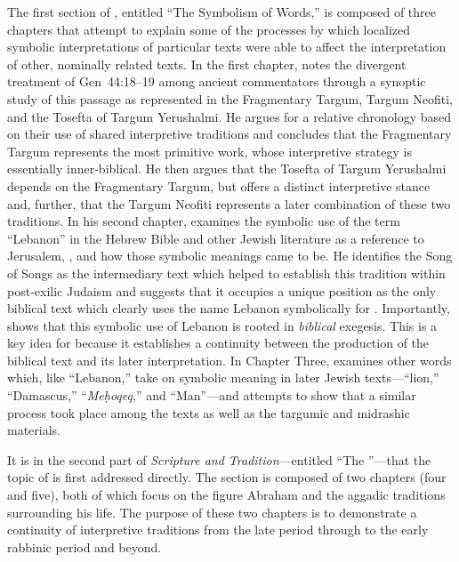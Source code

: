 The first section of , entitled ``The Symbolism of Words,'' is composed of three chapters that attempt to explain some of the processes by which localized symbolic interpretations of particular texts were able to affect the interpretation of other, nominally related texts.
%
In the first chapter, \vermes notes the divergent treatment of Gen~44:18--19 among ancient commentators through a synoptic study of this passage as represented in the Fragmentary Targum, Targum Neofiti, and the Tosefta of Targum Yerushalmi. He argues for a relative chronology based on their use of shared interpretive traditions and concludes that the Fragmentary Targum represents the most primitive work, whose interpretive strategy is essentially inner-biblical. He then argues that the Tosefta of Targum Yerushalmi depends on the Fragmentary Targum, but offers a distinct interpretive stance and, further, that the Targum Neofiti represents a later combination of these two traditions.
%
In his second chapter, \vermes examines the symbolic use of the term ``Lebanon'' in the Hebrew Bible and other Jewish literature as a reference to Jerusalem, \thetemple, and how those symbolic meanings came to be. He identifies the Song of Songs as the intermediary text which helped to establish this tradition within post-exilic Judaism and suggests that it occupies a unique position as the only biblical text which clearly uses the name Lebanon symbolically for \thetemple. Importantly, \vermes shows that this symbolic use of Lebanon is rooted in \emph{biblical} exegesis. This is a key idea for \vermes because it establishes a continuity between the production of the biblical text and its later interpretation.
%
In Chapter Three, \vermes examines other words which, like ``Lebanon,'' take on symbolic meaning in later Jewish texts---``lion,'' ``Damascus,'' ``\emph{Meḥoqeq},'' and ``Man''---and attempts to show that a similar process took place among the \dss texts as well as the targumic and midrashic materials. 

It is in the second part of \emph{Scripture and Tradition}---entitled ``The \rwb''---that the topic of \rwb is first addressed directly. The section is composed of two chapters (four and five), both of which focus on the figure Abraham and the aggadic traditions surrounding his life. The purpose of these two chapters is to demonstrate a continuity of interpretive traditions from the late \secondtemple period through to the early rabbinic period and beyond. 

